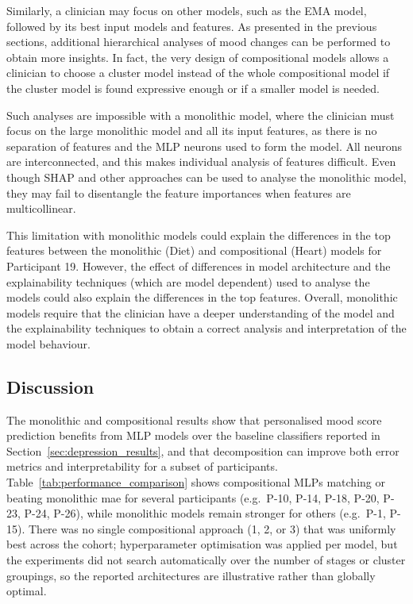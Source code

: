 Similarly, a clinician may focus on other models, such as the EMA model, followed by its best input models and features. As presented in the previous sections, additional hierarchical analyses of mood changes can be performed to obtain more insights. In fact, the very design of compositional models allows a clinician to choose a cluster model instead of the whole compositional model if the cluster model is found expressive enough or if a smaller model is needed.

Such analyses are impossible with a monolithic model, where the clinician must focus on the large monolithic model and all its input features, as there is no separation of features and the MLP neurons used to form the model. All neurons are interconnected, and this makes individual analysis of features difficult. Even though SHAP and other approaches can be used to analyse the monolithic model, they may fail to disentangle the feature importances when features are multicollinear. 

This limitation with monolithic models could explain the differences in the top features between the monolithic (Diet) and compositional (Heart) models for Participant 19. However, the effect of differences in model architecture and the explainability techniques (which are model dependent) used to analyse the models could also explain the differences in the top features. Overall, monolithic models require that the clinician have a deeper understanding of the model and the explainability techniques to obtain a correct analysis and interpretation of the model behaviour. 


\subsection{Discussion}
\label{sec:depression_results_discussion}

The monolithic and compositional results show that personalised mood score prediction benefits from MLP models over the baseline classifiers reported in Section~\ref{sec:depression_results}, and that decomposition can improve both error metrics and interpretability for a subset of participants. Table~\ref{tab:performance_comparison} shows compositional MLPs matching or beating monolithic \gls{mae} for several participants (e.g.\ P-10, P-14, P-18, P-20, P-23, P-24, P-26), while monolithic models remain stronger for others (e.g.\ P-1, P-15). There was no single compositional approach (1, 2, or 3) that was uniformly best across the cohort; hyperparameter optimisation was applied per model, but the experiments did not search automatically over the number of stages or cluster groupings, so the reported architectures are illustrative rather than globally optimal.

